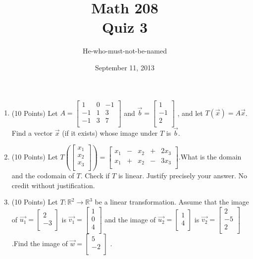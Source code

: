 \documentclass[12pt]{article}
\title{Math 208\\Quiz 3}
\date{September 11, 2013}
\author{He-who-must-not-be-named}
\begin{document}
\maketitle
\begin{enumerate}
	\item (10 Points) 
	Let
		$A = \left[\begin{array}{rrr}
			1&0&-1\\
			-1&1&3\\
			-1&3&7\\
	  	\end{array}\right]$ 
	and 
		$\vec{b} = \left[\begin{array}{r}
			1\\
			-1\\
			2\\
	  \end{array}\right]$
	, and let $T(\vec{x}) = A\vec{x}$. Find a vector $\vec{x}$ (if it exists) whose image under $T$ is $\vec{b}$.

	\item (10 Points) 
	Let 
		$T\left(\left[\begin{array}{r}
			x_1\\
			x_2\\
			x_3\\
		\end{array}\right]\right)
		= \left[\begin{array}{rrrrr}
			x_1&-&x_2&+&2x_3\\	
			x_1&+&x_2&-&3x_3\\
		\end{array}\right].
	$What is the domain and the codomain of $T$. Check if $T$ is linear. Justify precisely your answer. No credit without
	justification.

	\item (10 Points)
	 Let $T : \mathbb{R}^2 \longrightarrow \mathbb{R}^3$ be a linear transformation. Assume that the image of 
		$\vec{u_1} = \left[\begin{array}{r}
		2\\
		-3\\
		\end{array}\right]$
	is
		$\vec{v_1} = \left[\begin{array}{r}
		1\\
		0\\
		4\\
		\end{array}\right]$
	and the image of 
		$\vec{u_2} = \left[\begin{array}{r}
		1\\
		4\\
		\end{array}\right]$
	is
		$\vec{v_2} = \left[\begin{array}{r}
		2\\
		-5\\
		2\\
		\end{array}\right]$
	.Find the image of 
		$\vec{w} = \left[\begin{array}{r}
		5\\
		-2\\
		\end{array}\right]$
	.
\end{enumerate}
\end{document}
